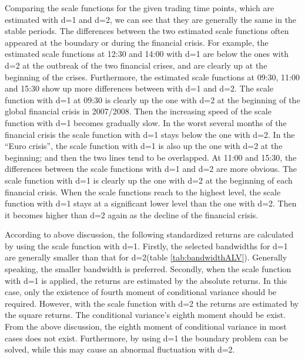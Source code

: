 Comparing the scale functions for the given trading time points, which are estimated with d=1 and d=2, we can see that they are generally the same in the stable periods. The differences between the two estimated scale functions often appeared at the boundary or during the financial crisis. For example, the estimated scale functions at 12:30 and 14:00 with d=1 are below the ones with d=2 at the outbreak of the two financial crises, and are clearly up at the beginning of the crises. 
Furthermore, the estimated scale functions at 09:30, 11:00 and 15:30 show up more differences between with d=1 and d=2. The scale function with d=1 at 09:30 is clearly up the one with d=2 at the beginning of the global financial crisis in 2007/2008. Then the increasing speed of the scale function with d=1 becomes gradually slow. In the worst several months of the financial crisis the scale function with d=1 stays below the one with d=2. In the ``Euro crisis'', the scale function with d=1 is also up the one with d=2 at the beginning; and then the two lines tend to be overlapped. At 11:00 and 15:30, the differences between the scale functions with d=1 and d=2 are more obvious. The scale function with d=1 is clearly up the one with d=2 at the beginning of each financial crisis. When the scale functions reach to the highest level, the scale function with d=1 stays at a significant lower level than the one with d=2. Then it becomes higher than d=2 again as the decline of the financial crisis.

According to above discussion, the following standardized returns are calculated by using the scale function with d=1. Firstly, the selected bandwidths for d=1 are generally smaller than that for d=2(table \ref{tab:bandwidthALV}). Generally speaking, the smaller bandwidth is preferred. Secondly, when the scale function with d=1 is applied, the returns are estimated by the absolute returns. In this case, only the existence of fourth moment of conditional variance should be required. However, with the scale function with d=2 the returns are estimated by the square returns. The conditional variance's eighth moment should be exist. From the above discussion, the eighth moment of conditional variance in most cases does not exist. Furthermore, by using d=1 the boundary problem can be solved, while this may cause an abnormal fluctuation with d=2.


